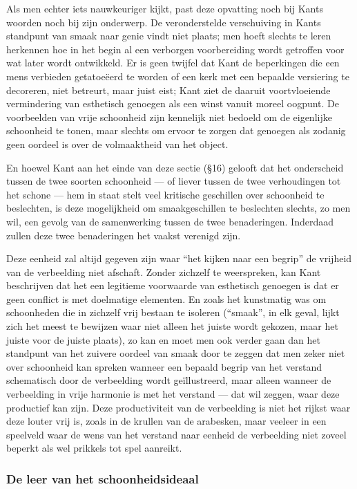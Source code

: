 Als men echter iets nauwkeuriger kijkt, past deze opvatting noch bij Kants woorden noch bij zijn onderwerp. De veronderstelde verschuiving in Kants standpunt van smaak naar genie vindt niet plaats; men hoeft slechts te leren herkennen hoe in het begin al een verborgen voorbereiding wordt getroffen voor wat later wordt ontwikkeld. Er is geen twijfel dat Kant de beperkingen die een mens verbieden getatoeëerd te worden of een kerk met een bepaalde versiering te decoreren, niet betreurt, maar juist eist; Kant ziet de daaruit voortvloeiende vermindering van esthetisch genoegen als een winst vanuit moreel oogpunt. De voorbeelden van vrije schoonheid zijn kennelijk niet bedoeld om de eigenlijke schoonheid te tonen, maar slechts om ervoor te zorgen dat genoegen als zodanig geen oordeel is over de volmaaktheid van het object.

En hoewel Kant aan het einde van deze sectie (§16) gelooft dat het onderscheid tussen de twee soorten schoonheid — of liever tussen de twee verhoudingen tot het schone — hem in staat stelt veel kritische geschillen over schoonheid te beslechten, is deze mogelijkheid om smaakgeschillen te beslechten slechts, zo men wil, een gevolg van de samenwerking tussen de twee benaderingen. Inderdaad zullen deze twee benaderingen het vaakst verenigd zijn.

Deze eenheid zal altijd gegeven zijn waar ``het kijken naar een begrip'' de vrijheid van de verbeelding niet afschaft. Zonder zichzelf te weerspreken, kan Kant beschrijven dat het een legitieme voorwaarde van esthetisch genoegen is dat er geen conflict is met doelmatige elementen. En zoals het kunstmatig was om schoonheden die in zichzelf vrij bestaan te isoleren (``smaak'', in elk geval, lijkt zich het meest te bewijzen waar niet alleen het juiste wordt gekozen, maar het juiste voor de juiste plaats), zo kan en moet men ook verder gaan dan het standpunt van het zuivere oordeel van smaak door te zeggen dat men zeker niet over schoonheid kan spreken wanneer een bepaald begrip van het verstand schematisch door de verbeelding wordt geïllustreerd, maar alleen wanneer de verbeelding in vrije harmonie is met het verstand — dat wil zeggen, waar deze productief kan zijn. Deze productiviteit van de verbeelding is niet het rijkst waar deze louter vrij is, zoals in de krullen van de arabesken, maar veeleer in een speelveld waar de wens van het verstand naar eenheid de verbeelding niet zoveel beperkt als wel prikkels tot spel aanreikt.

\subsubsection{De leer van het schoonheidsideaal}

